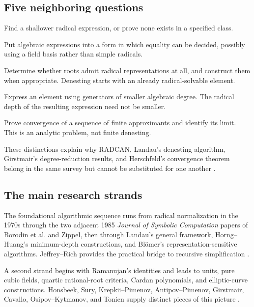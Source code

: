 \documentclass[11pt,a4paper]{article}
\numberwithin{equation}{section}
\theoremstyle{definition}\newtheorem{definition}[theorem]{Definition}
\theoremstyle{remark}\newtheorem{remark}[theorem]{Remark}
\begin{document}
\subsection{Five neighboring questions}
\begin{description}[style=nextline,leftmargin=0pt,labelwidth=0pt]
\item[Denesting.] Find a shallower radical expression, or prove none exists in a specified class.
\item[Normalization and zero testing.] Put algebraic expressions into a form in which equality can be decided, possibly using a field basis rather than simple radicals.
\item[Solving polynomials by radicals.] Determine whether roots admit radical representations at all, and construct them when appropriate. Denesting starts with an already radical-solvable element.
\item[Degree reduction.] Express an element using generators of smaller algebraic degree. The radical depth of the resulting expression need not be smaller.
\item[Infinite-radical evaluation.] Prove convergence of a sequence of finite approximants and identify its limit. This is an analytic problem, not finite denesting.
\end{description}
These distinctions explain why RADCAN, Landau's denesting algorithm, Girstmair's degree-reduction results, and Herschfeld's convergence theorem belong in the same survey but cannot be substituted for one another \cite{caviness76,landau92,girstmair,herschfeld}.

\subsection{The main research strands}
The foundational algorithmic sequence runs from radical normalization in the 1970s through the two adjacent 1985 \emph{Journal of Symbolic Computation} papers of Borodin et al. and Zippel, then through Landau's general framework, Horng--Huang's minimum-depth constructions, and Bl\"omer's representation-sensitive algorithms. Jeffrey--Rich provides the practical bridge to recursive simplification \cite{caviness76,bfht,zippel85,landau92,horng90,bloemer92,bloemer00,jeffrey}.

A second strand begins with Ramanujan's identities and leads to units, pure cubic fields, quartic rational-root criteria, Cardan polynomials, and elliptic-curve constructions. Honsbeek, Sury, Krepkii--Pimenov, Antipov--Pimenov, Girstmair, Cavallo, Osipov--Kytmanov, and Tonien supply distinct pieces of this picture \cite{berndt97,berndt98,honsbeek05,sury,krepkii,antipov,girstmair,cavallo,osipov21,tonien}.
\end{document}

